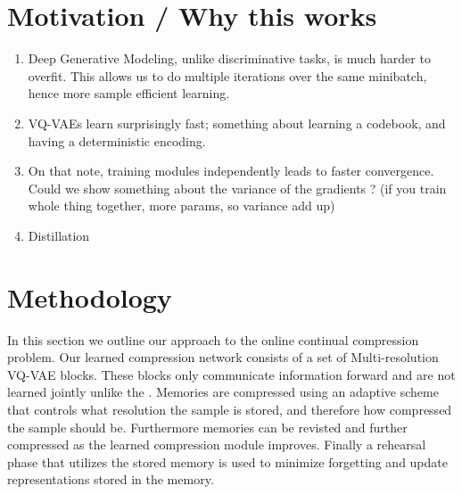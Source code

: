 \documentclass[colorinlistoftodos]{article} %
\begin{document}


\section{Motivation / Why this works}
\begin{enumerate}
    \item Deep Generative Modeling, unlike discriminative tasks, is much harder to overfit. This allows us to do multiple iterations over the same minibatch, hence more sample efficient learning. 
    \item VQ-VAEs learn surprisingly fast; something about learning a codebook, and having a deterministic encoding.
    \item On that note, training modules independently leads to faster convergence. Could we show something about the variance of the gradients ? (if you train whole thing together, more params, so variance add up)
    \item Distillation
\end{enumerate}





\section{Methodology}
In this section we outline our approach to the online continual compression problem. Our learned compression network consists of a set of Multi-resolution VQ-VAE blocks. These blocks only communicate information forward and are not learned jointly unlike the \cite{VQVAE-multi}. Memories are compressed using an adaptive scheme that controls what resolution the sample is stored, and therefore how compressed the sample should be. Furthermore memories can be revisted and further compressed as the learned compression module improves. Finally a rehearsal phase that utilizes the stored memory is used to minimize forgetting and update representations stored in the memory. 
\end{document}
